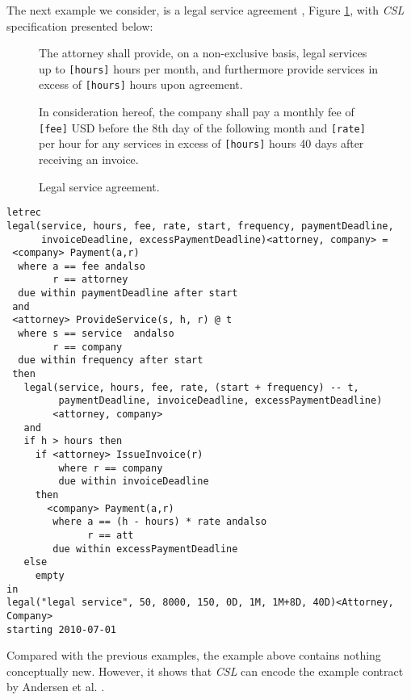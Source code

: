\documentclass[orivec,final]{llncs-href}
\newcommand{\csl}{\textit{CSL}}
\newcounter{paragraphcounter}
\newenvironment{papercontract}
  {\begin{list}{\textbf{Paragraph \arabic{paragraphcounter}.}}{\usecounter{paragraphcounter}\leftmargin=0pt\itemindent=17pt\rightmargin=0pt\topsep=7pt\itemsep=2pt}}
  {\end{list}}
\newcommand{\contractparam}[1]{{\texttt{[#1]}}}
\begin{document}
The next example we consider, is a legal service agreement
\cite{andersen06contracts}, Figure \ref{fig:legalservice}, with \csl{}
specification presented below:
\begin{figure}[t]
  \begin{papercontract}
  \item The attorney shall provide, on a non-exclusive basis, legal
    services up to \contractparam{hours} hours per month, and
    furthermore provide services in excess of \contractparam{hours}
    hours upon agreement.
  \item In consideration hereof, the company shall pay a monthly fee of
    \contractparam{fee} USD before the 8th day of the following month and
    \contractparam{rate} per hour for any services in excess of
    \contractparam{hours} hours 40 days after receiving an invoice.
  \end{papercontract}
  \caption{Legal service agreement.}\label{fig:legalservice}
\end{figure}

\begin{lstlisting}[language=csl]
letrec
legal(service, hours, fee, rate, start, frequency, paymentDeadline,
      invoiceDeadline, excessPaymentDeadline)<attorney, company> =
 <company> Payment(a,r)
  where a == fee andalso
        r == attorney
  due within paymentDeadline after start
 and
 <attorney> ProvideService(s, h, r) @ t
  where s == service  andalso
        r == company
  due within frequency after start
 then
   legal(service, hours, fee, rate, (start + frequency) -- t,
         paymentDeadline, invoiceDeadline, excessPaymentDeadline)
        <attorney, company>
   and
   if h > hours then
     if <attorney> IssueInvoice(r)
         where r == company
         due within invoiceDeadline
     then
       <company> Payment(a,r)
        where a == (h - hours) * rate andalso
              r == att
        due within excessPaymentDeadline
   else
     empty
in
legal("legal service", 50, 8000, 150, 0D, 1M, 1M+8D, 40D)<Attorney, Company>
starting 2010-07-01
\end{lstlisting}
Compared with the previous examples, the example above contains
nothing conceptually new. However, it shows that \csl{} can encode the
example contract by Andersen et al. \cite{andersen06contracts}.
\end{document}

